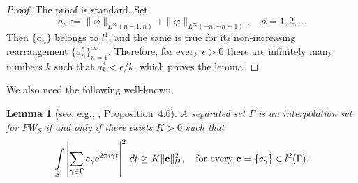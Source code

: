 \documentclass[12pt]{amsart}
\numberwithin{equation}{section}
\newtheorem{lemma}[theorem]{Lemma}
\begin{document}
\begin{proof}  The proof is standard. Set 
$$a_n:=\|\varphi\|_{L^\infty(n-1,n)}+\|\varphi\|_{L^\infty(-n,-n+1)},\quad n=1,2,...$$Then $\{a_n\}$ belongs to $l^1$, and the same is true for its   non-increasing rearrangement  $\{a_n^\ast\}_{n=1}^\infty$.
Therefore, for every $\epsilon>0$ there are infinitely many numbers $k$ such that $a_k^\ast<\epsilon/k$, which proves the lemma. \end{proof}


We also need the following well-known

\begin{lemma}[see, e.g., \cite{ou}, Proposition~4.6]\label{lint}
  A separated set  $\Gamma$ is an interpolation set for $PW_S$ if and only if there exists  $K>0$ such that\begin{equation}\label{sta}\int\limits_{S}\left|\sum_{\gamma\in\Gamma}c_\gamma e^{2\pi i \gamma t}\right|^2\,dt\geq K\|\cc\|^2_{l^2},\quad  \mbox{for every } \cc=\{c_\gamma\}\in l^2(\Gamma). \end{equation}
\end{lemma}
\end{document}
